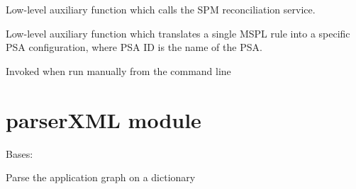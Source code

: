 \documentclass[letterpaper,10pt,oneside]{sphinxmanual}
\begin{document}
\begin{fulllineitems}
\begin{fulllineitems}
\end{fulllineitems}


\begin{fulllineitems}
\label{online_workflow_manager:online_workflow_manager.WorkflowManager.spm_reconcile}
Low-level auxiliary function which calls the SPM reconciliation
service.

\end{fulllineitems}


\begin{fulllineitems}
\label{online_workflow_manager:online_workflow_manager.WorkflowManager.translate}
Low-level auxiliary function which translates a single MSPL
rule into a specific PSA configuration, where PSA ID is
the name of the PSA.

\end{fulllineitems}


\end{fulllineitems}


\begin{fulllineitems}
\label{online_workflow_manager:online_workflow_manager.main}
Invoked when run manually from the command line

\end{fulllineitems}



\chapter{parserXML module}
\label{parserXML:module-parserXML}\label{parserXML::doc}\label{parserXML:parserxml-module}

\begin{fulllineitems}
\label{parserXML:parserXML.parseXml}
Bases: 

\begin{fulllineitems}
\label{parserXML:parserXML.parseXml.parseAG}
Parse the application graph on a dictionary

\end{fulllineitems}


\end{fulllineitems}
\end{document}
